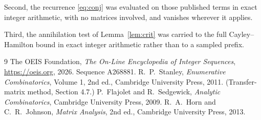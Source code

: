\documentclass[11pt,a4paper]{article}
\theoremstyle{plain}
\theoremstyle{definition}
\begin{document}
Second, the recurrence \eqref{eq:conj} was evaluated on those published terms in exact
integer arithmetic, with no matrices involved, and vanishes wherever it applies.

Third, the annihilation test of Lemma~\ref{lem:crit} was carried to the full
Cayley--Hamilton bound in exact integer arithmetic rather than to a sampled prefix.

\begin{thebibliography}{9}
 The OEIS Foundation, \emph{The On-Line Encyclopedia of Integer
Sequences}, \url{https://oeis.org}, 2026. Sequence A268881.
 R.~P.~Stanley, \emph{Enumerative Combinatorics}, Volume 1, 2nd ed.,
Cambridge University Press, 2011. (Transfer-matrix method, Section 4.7.)
 P.~Flajolet and R.~Sedgewick, \emph{Analytic Combinatorics}, Cambridge
University Press, 2009.
 R.~A.~Horn and C.~R.~Johnson, \emph{Matrix Analysis}, 2nd ed., Cambridge
University Press, 2013.
\end{thebibliography}
\end{document}
